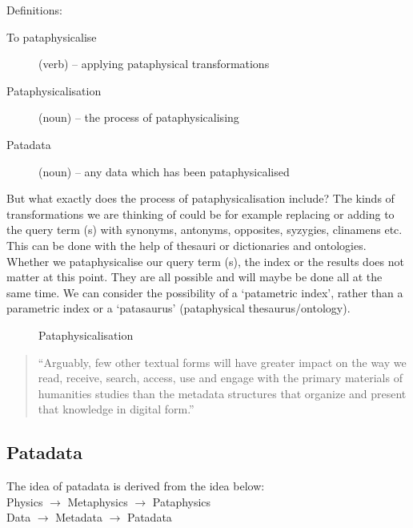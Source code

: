 Definitions:
\begin{description}
  \item [To pataphysicalise] (verb) – applying pataphysical transformations
  \item [Pataphysicalisation] (noun) – the process of pataphysicalising
  \item [Patadata] (noun) – any data which has been pataphysicalised
\end{description}

But what exactly does the process of pataphysicalisation include? The kinds of transformations we are thinking of could be for example replacing or adding to the query term (s) with synonyms, antonyms, opposites, syzygies, clinamens etc. This can be done with the help of thesauri or dictionaries and ontologies. Whether we pataphysicalise our query term (s), the index or the results does not matter at this point. They are all possible and will maybe be done all at the same time. We can consider the possibility of a `patametric index', rather than a parametric index or a `patasaurus' (pataphysical thesaurus/ontology).

\begin{figure}[htb] %
  \centering
  \def\svgwidth{\columnwidth}
  
\caption[Pataphysicalisation]{Pataphysicalisation}
\label{fig:patasearch02f}
\end{figure}

\begin{quote}
  ``Arguably, few other textual forms will have greater impact on the way we read, receive, search, access, use and engage with the primary materials of humanities studies than the metadata structures that organize and present that knowledge in digital form.'' \autocite[p.9]{Drucker2009}
\end{quote}


\subsection*{Patadata}

The idea of patadata is derived from the idea below:\\
Physics $\to$ Metaphysics $\to$ Pataphysics\\
Data $\to$ Metadata $\to$ Patadata

